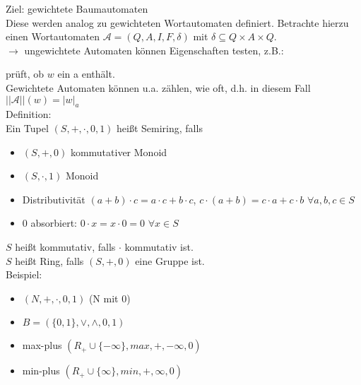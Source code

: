 \documentclass[titlepage]{article}
\begin{document}
Ziel: gewichtete Baumautomaten\\
Diese werden analog zu gewichteten Wortautomaten definiert.
Betrachte hierzu einen Wortautomaten $\mathcal{A} = (Q,A,I,F,\delta)$ mit $\delta \subseteq Q \times A \times Q$.\\
$\rightarrow$ ungewichtete Automaten k\"onnen Eigenschaften testen, z.B.:\\

pr\"uft, ob $w$ ein a enth\"alt.\\
Gewichtete Automaten k\"onnen u.a. z\"ahlen, wie oft, d.h. in diesem Fall
$||\mathcal{A}||(w) = |w|_a$\\

Definition:\\
Ein Tupel $(S,+,\cdot,0,1)$ hei\ss t Semiring, falls
\begin{itemize}
    \item $(S,+,0)$ kommutativer Monoid
    \item $(S,\cdot,1)$ Monoid
    \item Distributivit\"at $(a+b) \cdot c = a \cdot c + b \cdot c$,
        $c \cdot (a+b) = c \cdot a + c \cdot b$ $\forall a,b,c \in S$
    \item $0$ absorbiert: $0 \cdot x = x \cdot 0 = 0$ $\forall x \in S$
\end{itemize}

$S$ hei\ss t kommutativ, falls $\cdot$ kommutativ ist.\\
$S$ hei\ss t Ring, falls $(S, +, 0)$ eine Gruppe ist.\\

Beispiel:
\begin{itemize}
    \item $(N,+,\cdot,0,1)$ (N mit 0)
    \item $B = (\{0,1\},\lor,\land,0,1)$
    \item max-plus $(R_+ \cup \{-\infty\},max,+,-\infty,0)$
    \item min-plus $(R_+ \cup \{\infty\},min,+,\infty,0)$
\end{itemize}
\end{document}
